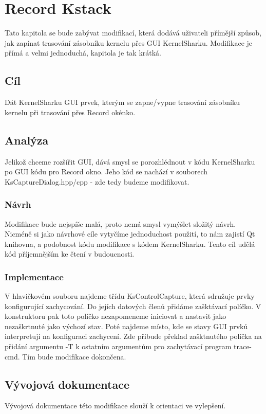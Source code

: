 \chapter{Record Kstack}
Tato kapitola se bude zabývat modifikací, která dodává uživateli přímější způsob, jak zapínat trasování zásobníku kernelu přes GUI KernelSharku. Modifikace je přímá a velmi jednoduchá, kapitola je tak krátká.

\section{Cíl}
Dát KernelSharku GUI prvek, kterým se zapne/vypne trasování zásobníku kernelu při trasování přes Record okénko.

\section{Analýza}
Jelikož chceme rozšířit GUI, dává smysl se porozhlédnout v kódu KernelSharku po GUI kódu pro Record okno. Jeho kód se nachází v souborech KsCaptureDialog.hpp/cpp - zde tedy budeme modifikovat.

\subsection{Návrh}
Modifikace bude nejspíše malá, proto nemá smysl vymýšlet složitý návrh. Nicméně si jako návrhové cíle vytyčíme jednoduchost použití, to nám zajistí Qt knihovna, a podobnost kódu modifikace s kódem KernelSharku. Tento cíl udělá kód příjemnějším ke čtení v budoucnosti.

\subsection{Implementace}
V hlavičkovém souboru najdeme třídu KsControlCapture, která sdružuje prvky konfigurující zachycování. Do jejích datových členů přidáme zašktávací políčko. V konstruktoru pak toto políčko nezapomeneme iniciovat a nastavit jako nezaškrtnuté jako výchozí stav. Poté najdeme místo, kde se stavy GUI prvků interpretují na konfiguraci zachycení. Zde přibude překlad zašktnutého políčka na přidání argumentu -T k ostatním argumentům pro zachytávací program trace-cmd. Tím bude modifikace dokončena.

\section{Vývojová dokumentace}
Vývojová dokumentace této modifikace slouží k orientaci ve vylepšení.


